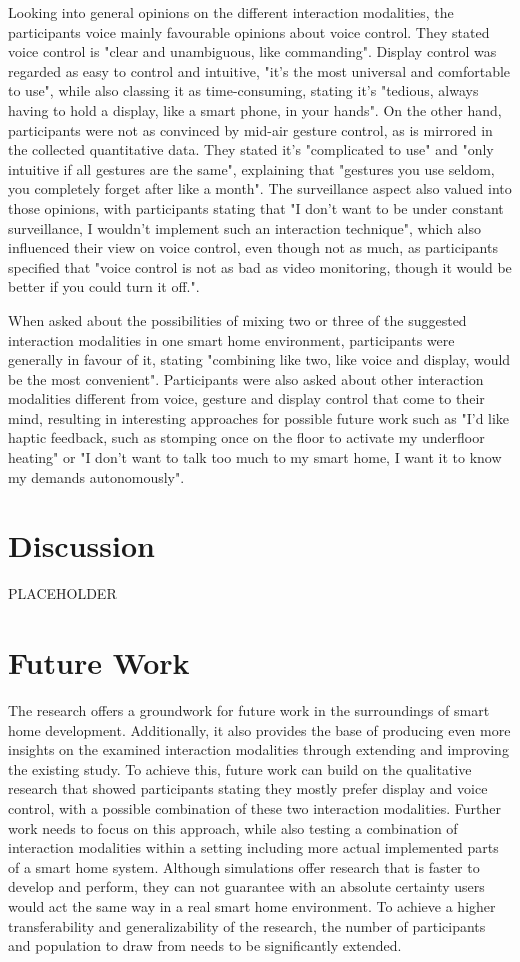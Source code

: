 \documentclass[sigchi]{acmart}
\begin{document}
	Looking into general opinions on the different interaction modalities, the participants voice mainly favourable opinions about voice control. They stated voice control is "clear and unambiguous, like commanding". Display control was regarded as easy to control and intuitive, "it's the most universal and comfortable to use", while also classing it as time-consuming, stating it's "tedious, always having to hold a display, like a smart phone, in your hands". On the other hand, participants were not as convinced by mid-air gesture control, as is mirrored in the collected quantitative data. They stated it's "complicated to use" and "only intuitive if all gestures are the same", explaining that "gestures you use seldom, you completely forget after like a month". The surveillance aspect also valued into those opinions, with participants stating that "I don't want to be under constant surveillance, I wouldn't implement such an interaction technique", which also influenced their view on voice control, even though not as much, as participants specified that "voice control is not as bad as video monitoring, though it would be better if you could turn it off.". 
	
	When asked about the possibilities of mixing two or three of the suggested interaction modalities in one smart home environment, participants were generally in favour of it, stating "combining like two, like voice and display, would be the most convenient". Participants were also asked about other interaction modalities different from voice, gesture and display control that come to their mind, resulting in interesting approaches for possible future work such as "I'd like haptic feedback, such as stomping once on the floor to activate my underfloor heating" or "I don't want to talk too much to my smart home, I want it to know my demands autonomously". 
	
	\section{Discussion}
	PLACEHOLDER
	
	\section{Future Work}
	The research offers a groundwork for future work in the surroundings of smart home development. Additionally, it also provides the base of producing even more insights on the examined interaction modalities through extending and improving the existing study. To achieve this, future work can build on the qualitative research that showed participants stating they mostly prefer display and voice control, with a possible combination of these two interaction modalities. Further work needs to focus on this approach, while also testing a combination of interaction modalities within a setting including more actual implemented parts of a smart home system. Although simulations offer research that is faster to develop and perform, they can not guarantee with an absolute certainty users would act the same way in a real smart home environment. To achieve a higher transferability and generalizability of the research, the number of participants and population to draw from needs to be significantly extended. 
	
\end{document}
